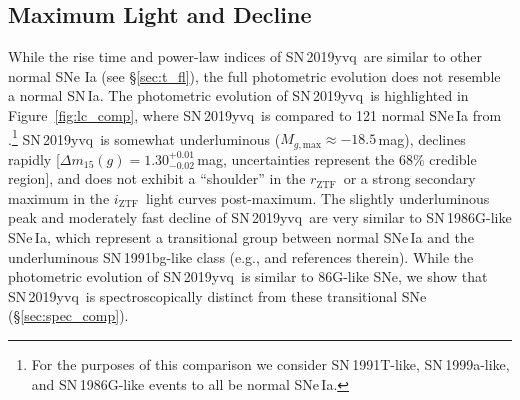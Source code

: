 \documentclass[twocolumn]{aastex63}
\newcommand{\rztf}{$r_\mathrm{ZTF}$}
\newcommand{\iztf}{$i_\mathrm{ZTF}$}
\newcommand{\sn}{SN\,2019yvq}
\begin{document}
\subsection{Maximum Light and Decline}\label{sec:max_decline}

While the rise time and power-law indices of \sn\ are similar to other normal
SNe Ia (see \S\ref{sec:t_fl}), the full photometric evolution does not
resemble a normal SN\,Ia. The photometric evolution of \sn\ is highlighted in
Figure~\ref{fig:lc_comp}, where \sn\ is compared to 121 normal SNe\,Ia from
\citet{Yao19}.\footnote{For the purposes of this comparison we consider
SN\,1991T-like, SN\,1999a-like, and SN\,1986G-like events to all be normal
SNe\,Ia.} \sn\ is somewhat underluminous ($M_{g,\mathrm{max}} \approx
-18.5$\,mag), declines rapidly [$\Delta m_{15}(g) =
1.30^{+0.01}_{-0.02}$\,mag, uncertainties represent the 68\% credible region],
and does not exhibit a ``shoulder'' in the \rztf\ or a strong secondary
maximum in the \iztf\ light curves post-maximum. The slightly underluminous
peak and moderately fast decline of \sn\ are very similar to SN\,1986G-like
SNe\,Ia, which represent a transitional group between normal SNe\,Ia and the
underluminous SN\,1991bg-like class (e.g., \citealt{Taubenberger17} and
references therein). While the photometric evolution of \sn\ is similar to
86G-like SNe, we show that \sn\ is spectroscopically distinct from these
transitional SNe (\S\ref{sec:spec_comp}).
\end{document}
